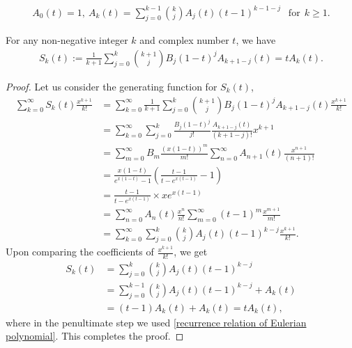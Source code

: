 \documentclass[10pt,a4paper]{amsart}
\begin{document}
\begin{align}\label{recurrence relation of Eulerian polynomial}
A_0(t)=1,  ~ A_k(t)=\sum_{j=0}^{k-1} {k \choose j} A_j(t)(t-1)^{k-1-j} ~~\textrm{ for}~~ k \geq 1.
\end{align}

\begin{lemma}\label{relation between B_n and A_n(t)}
For any non-negative integer $k$ and complex number $t$, we have
\begin{align*}
S_k(t):=\frac{1}{k+1}\sum_{j=0}^k {k+1 \choose j} B_j(1-t)^j A_{k+1-j}(t)=tA_k(t).
\end{align*}
\end{lemma}

\begin{proof}
 Let us consider the generating function for $S_k(t)$,  
{\allowdisplaybreaks
\begin{align*}
\sum_{k=0}^\infty S_k(t) \frac{x^{k+1}}{k!} &= \sum_{k=0}^\infty \frac{1}{k+1}\sum_{j=0}^k {k+1 \choose j} B_j(1-t)^j A_{k+1-j}(t) \frac{x^{k+1}}{k!}\\
&= \sum_{k=0}^\infty \sum_{j=0}^k \frac{B_j (1-t)^j}{j!} \frac{A_{k+1-j}(t)}{(k+1-j)!} x^{k+1}\\
&= \sum_{m=0}^\infty B_m \frac{(x(1-t))^m}{m!} \sum_{n=0}^\infty A_{n+1}(t) \frac{x^{n+1}}{(n+1)!}\\
&=\frac{x(1-t)}{e^{x(1-t)}-1} \left( \frac{t-1}{t-e^{x(t-1)}}-1 \right)\\
&=\frac{t-1}{t-e^{x(t-1)}} \times xe^{x(t-1)}\\
&=\sum_{n=0}^\infty A_n(t) \frac{x^n}{n!} \sum_{m=0}^\infty (t-1)^m \frac{x^{m+1}}{m!}\\
&=\sum_{k=0}^\infty \sum_{j=0}^k {k \choose j} A_j(t)(t-1)^{k-j} \frac{x^{k+1}}{k!}.
\end{align*}}
Upon comparing the coefficients of $\frac{x^{k+1}}{k!}$, we get
\begin{align*}
S_k(t)&=\sum_{j=0}^k {k \choose j} A_j(t)(t-1)^{k-j}\\
&=\sum_{j=0}^{k-1} {k \choose j} A_j(t)(t-1)^{k-j} + A_k(t)\\
&=(t-1)A_k(t)+A_k(t)=tA_k(t),
\end{align*}
where in the penultimate step we used \eqref{recurrence relation of Eulerian polynomial}.  This completes the proof.  
\end{proof}
\end{document}
